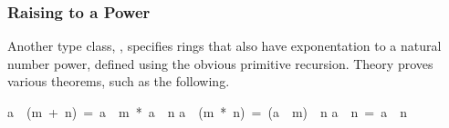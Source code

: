 \subsubsection{Raising to a Power}

Another type class, , specifies rings that also have 
exponentation to a natural number power, defined using the obvious primitive
recursion. Theory  proves various theorems, such as the 
following.
\begin{isabelle}
a\ \isacharcircum \ (m\ +\ n)\ =\ a\ \isacharcircum \ m\ *\ a\ \isacharcircum \ n%
\isanewline
a\ \isacharcircum \ (m\ *\ n)\ =\ (a\ \isacharcircum \ m)\ \isacharcircum \ n%
\isanewline
\isasymbar a\ \isacharcircum \ n\isasymbar \ =\ \isasymbar a\isasymbar \ \isacharcircum \ n%
\end{isabelle}%
